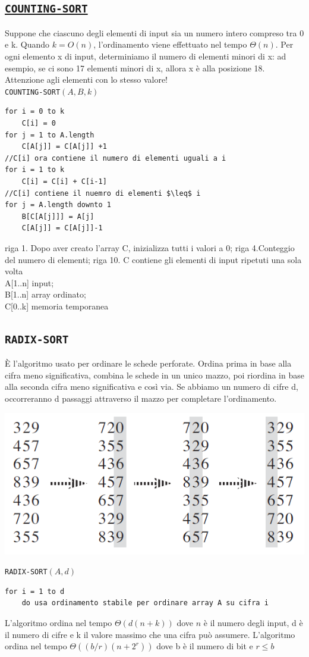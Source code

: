 \documentclass[11pt,a4paper]{article}
\begin{document}
\subsection{\href{http://www.cs.miami.edu/home/burt/learning/Csc517.101/workbook/countingsort.html}{\texttt{COUNTING-SORT}}}
Suppone che ciascuno degli elementi di input sia un numero intero compreso tra 0 e k. Quando $k =O(n)$,
l’ordinamento viene effettuato nel tempo $\Theta(n)$.
Per ogni elemento x di input, determiniamo il numero di elementi minori di x: ad esempio, se ci sono 17
elementi minori di x, allora x è alla posizione 18. Attenzione agli elementi con lo stesso valore!\medskip\\
\texttt{COUNTING-SORT}$(A, B, k)$
\begin{lstlisting}[mathescape=true]
for i = 0 to k
    C[i] = 0
for j = 1 to A.length
    C[A[j]] = C[A[j]] +1
//C[i] ora contiene il numero di elementi uguali a i
for i = 1 to k
    C[i] = C[i] + C[i-1]
//C[i] contiene il nuemro di elementi $\leq$ i
for j = A.length downto 1
    B[C[A[j]]] = A[j]
    C[A[j]] = C[A[j]]-1
\end{lstlisting}
riga 1. Dopo aver creato l’array C, inizializza tutti i valori a 0; riga 4.Conteggio del numero di elementi; riga 10. C contiene gli elementi di input ripetuti una sola volta\medskip\\
A[1..n] input;\\ B[1..n] array ordinato;\\ C[0..k] memoria temporanea

\subsection{\texttt{RADIX-SORT}}
È l’algoritmo usato per ordinare le schede perforate. Ordina
prima in base alla cifra meno significativa, combina le schede in
un unico mazzo, poi riordina in base alla seconda cifra meno
significativa e così via.
Se abbiamo un numero di cifre d, occorreranno d passaggi
attraverso il mazzo per completare l’ordinamento.
\begin{center}
      \includegraphics[scale=0.4]{img/radixsort.png}
\end{center}
\texttt{RADIX-SORT}$(A, d)$
\begin{lstlisting}
for i = 1 to d
    do usa ordinamento stabile per ordinare array A su cifra i
\end{lstlisting}
L’algoritmo ordina nel tempo $\Theta(d(n+k))$ dove $n$ è il numero degli input, d è il numero di cifre e k il valore
massimo che una cifra può assumere.
L’algoritmo ordina nel tempo $\Theta((b/r)(n+2^r))$ dove b è il numero di bit e $r \leq b$
\end{document}
